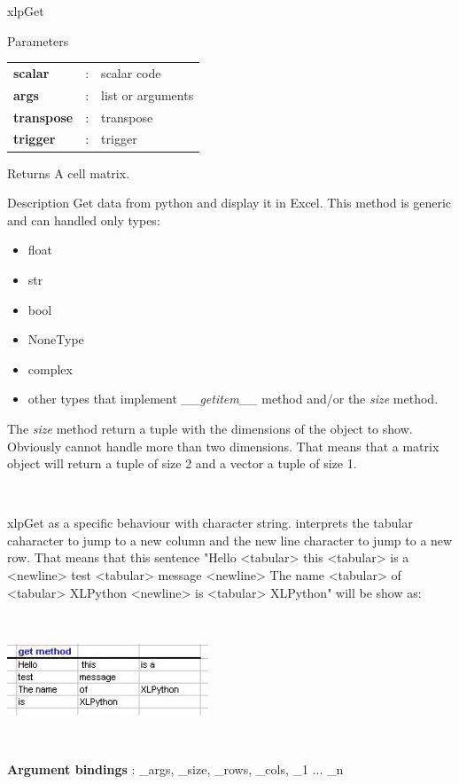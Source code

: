 \begin{xlpfunctitle}{xlpGet}

\begin{xlpfunc}{Parameters}
\begin{tabular}{p{3.5cm}cl}
\textbf{scalar}& : & scalar code \\
\textbf{args}& : & list or arguments \\
\textbf{transpose}& : & transpose   \\
\textbf{trigger}& : & trigger \\
\end{tabular}

\vspace{2mm}

\end{xlpfunc}


\begin{xlpfunc}{Returns}
A cell matrix.
\end{xlpfunc}

\begin{xlpfunc}{Description}
Get data from python and display it in Excel. This method is generic and can handled only types:
\begin{itemize}
\item float
\item str
\item bool
\item NoneType
\item complex
\item other types that implement {\sl \_\_getitem\_\_} method and/or the {\sl size} method. 
\end{itemize}

The {\sl size} method return a tuple with the dimensions of the object to show. Obviously \xlp cannot handle more than two dimensions. That means that a matrix object will return a tuple of size 2 and a vector a tuple of size 1.

\

xlpGet as a specific behaviour with character string. \xlp interprets the tabular caharacter to jump to a new column and the new line character to jump to a new row. That means that this sentence "Hello <tabular> this	<tabular> is a <newline> test <tabular>	message	<newline> The name <tabular> of <tabular>	XLPython <newline> is	<tabular> XLPython" will be show as: 

\

\includegraphics[width=6cm]{images/extstr2.jpg}


\

\textbf{Argument bindings} : \_args, \_size, \_rows, \_cols, \_1 ... \_n



\end{xlpfunc}
\end{xlpfunctitle}



